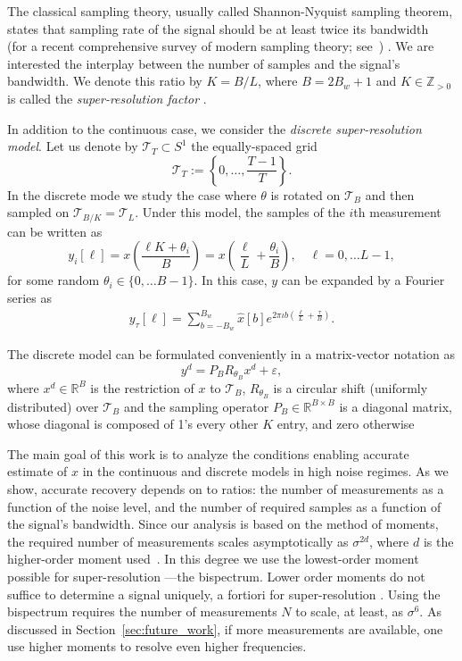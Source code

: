 \documentclass[english,12pt]{article}
\newcommand{\I}{\iota}
\newcommand{\tB}{B_w}
\newcommand{\T}{\mathcal{T}}
\newcommand{\SR}{super-resolution }
\newcommand{\TODO}[1]{{\color{red}{[#1]}}}
\numberwithin{equation}{section}
\numberwithin{thm}{section} %
\begin{document}
The classical sampling theory, usually called Shannon-Nyquist sampling theorem, states that sampling rate of the signal should be at least twice its bandwidth~\cite{shannon1949communication} (for a recent comprehensive survey of modern sampling theory; see~\cite{eldar2015sampling}) \TODO{This might be in the introduction}. 
We are interested the interplay between the number of samples and the signal's bandwidth. 
We denote this ratio by  $K=B/L$, where $B=2\tB+1$ and $K\in\mathbb{Z}_{>0}$ is called the \emph{\SR factor} .  


In addition to the continuous case, we consider the \emph{discrete \SR model}. Let us denote by $\T_T\subset S^1$ the equally-spaced grid 
\begin{equation} \label{eq:grid}
\mathcal{T}_T:=\left\{0,\ldots,\frac{T-1}{T}\right\}.
\end{equation}
In the discrete mode we study the case where $\theta$ is rotated on $\T_B$ and then sampled on $\T_{B/K}=\T_{L}$.
Under this model, the samples of the $i$th measurement can be  written as
\begin{equation}
y_i[\ell] = x\left(\frac{\ell K+\theta_i}{B}\right)=x\left(\frac{\ell}{L} + \frac{\theta_i}{B}\right), \quad \ell=0,\ldots L-1,
\end{equation}
for some random $\theta_i\in\{0,\ldots B-1\}$. 
In this case, $y$ can be expanded by a Fourier series as
\begin{eqnarray}
y_\tau[\ell] = \sum_{b=-\tB}^{\tB}\hat{x}[b]e^{2\pi\I b \left(\frac{\ell}{L} + \frac{\tau}{B}\right) }.
\end{eqnarray}

The discrete model can be formulated conveniently in a matrix-vector notation as  
\begin{equation} \label{eq:discrete_model}
y^d = P_BR_{\theta_B} x^d + \varepsilon,
\end{equation}
where $x^d\in\mathbb{R}^{B}$ is the restriction of $x$ to $\T_B$, $R_{\theta_B}$ is a circular shift (uniformly distributed) over  $\T_B$ and the sampling operator $P_B\in\mathbb{R}^{B\times B}$ is a diagonal matrix, whose diagonal is composed of 1's every other $K$ entry, and zero otherwise

The main goal of this work is to analyze the conditions enabling accurate estimate of $x$ in the continuous and discrete models in high noise regimes. As we show, accurate recovery depends on to ratios: the number of measurements as a function of the noise level, and the number of required samples as a function of the signal's bandwidth. Since our analysis is based on the method of moments, the required number of measurements scales asymptotically as $\sigma^{2d}$, where $d$ is the higher-order moment used~\cite{abbe2018estimation,bandeira2017estimation}. 
In this degree we use the lowest-order moment possible for \SR---the bispectrum. Lower order moments do not suffice to determine a signal uniquely, a fortiori for \SR. Using the bispectrum requires the number of measurements $N$ to scale, at least, as $\sigma^6$. 
As discussed in Section~\ref{sec:future_work}, if more measurements are available, one use higher moments to resolve even higher frequencies. 
\TODO{I am using moments/invariants interchangeably}
\end{document}
